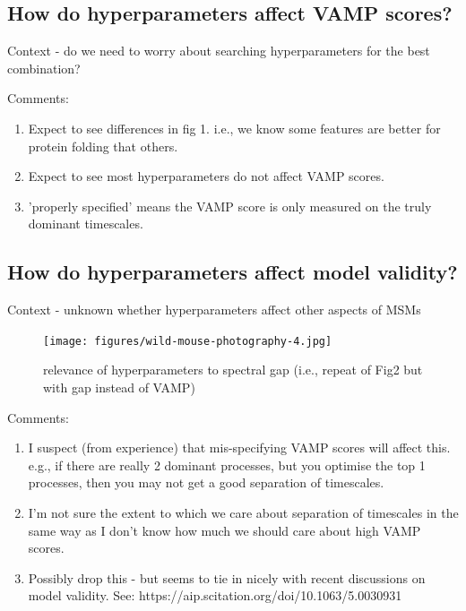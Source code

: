\documentclass{article}
\begin{document}
\subsection{How do hyperparameters affect VAMP scores? }

Context - do we need to worry about searching hyperparameters for the best combination? 





Comments: 
\begin{enumerate}
    \item Expect to see differences in fig 1. i.e., we know some features are better for protein folding that others. 
    \item Expect to see most hyperparameters do not affect VAMP scores. 
    \item 'properly specified' means the VAMP score is only measured on the truly dominant timescales. 
\end{enumerate}
 

\subsection{How do hyperparameters affect model validity?}

Context - unknown whether hyperparameters affect other aspects of MSMs

\begin{figure}
    \centering
    \texttt{[image: figures/wild-mouse-photography-4.jpg]}
    \caption{relevance of hyperparameters to spectral gap (i.e., repeat of Fig2 but with gap instead of VAMP) }
    \label{fig:4}
\end{figure}


Comments: 
\begin{enumerate}
    \item I suspect (from experience) that mis-specifying VAMP scores will affect this. e.g., if there are really 2 dominant processes, but you optimise the top 1 processes, then you may not get a good separation of timescales.  
    \item I'm not sure the extent to which we care about separation of timescales in the same way as I don't know how much we should care about high VAMP scores.  
    \item Possibly drop this - but seems to tie in nicely with recent discussions on model validity. See: https://aip.scitation.org/doi/10.1063/5.0030931
\end{enumerate}
\end{document}
